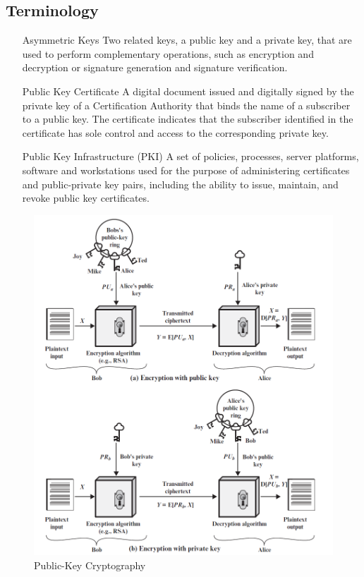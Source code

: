 \documentclass{article}
\begin{document}
\subsection{Terminology}
\begin{itemize}
    \item[Asymmetric Keys] Two related keys, a public key and a private key, that are used to perform complementary operations, such as encryption and decryption or signature generation and signature verification.
    \item[Public Key Certificate] A digital document issued and digitally signed by the private key of a Certification Authority that binds the name of a subscriber to a public key. The certificate indicates that the subscriber identified in the certificate has sole control and access to the corresponding private key.
    \item[Public Key Infrastructure (PKI)] A set of policies, processes, server platforms, software and workstations used for the purpose of administering certificates and public-private key pairs, including the ability to issue, maintain, and revoke public key certificates.
\end{itemize}

\begin{figure}[!h]
    \centering
    \includegraphics[width=\textwidth]{publickey.png}
    \caption{Public-Key Cryptography \cite{pubkey}}
    \label{fig:pubkey}
\end{figure}
\end{document}
